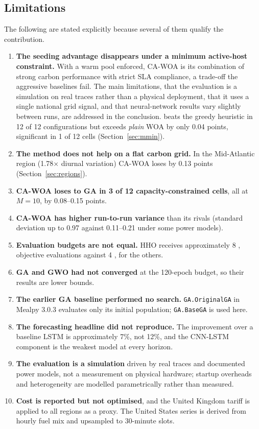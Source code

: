 \documentclass[12pt,a4paper]{article}
\providecommand{\DIFaddtex}[1]{{\protect\color{blue} \sf #1}} %
\providecommand{\DIFdeltex}[1]{{\protect\color{red} \scriptsize #1}} %
\providecommand{\DIFaddbegin}{} %
\providecommand{\DIFaddend}{} %
\providecommand{\DIFdelbegin}{} %
\providecommand{\DIFdelend}{} %
\providecommand{\DIFadd}[1]{\texorpdfstring{\DIFaddtex{#1}}{#1}} %
\providecommand{\DIFdel}[1]{\texorpdfstring{\DIFdeltex{#1}}{}} %
\providecommand{\DIFscaledelfig}{0.5}
\newlength{\DIFdelgraphicswidth} %
\newlength{\DIFdelgraphicsheight} %
\providecommand{\DIFaddincludegraphics}[2][]{{\color{blue}\fbox{\DIFOincludegraphics[#1]{#2}}}} %
\providecommand{\DIFdelincludegraphics}[2][]{%
\sbox{\DIFdelgraphicsbox}{\DIFOincludegraphics[#1]{#2}}%
\settoboxwidth{\DIFdelgraphicswidth}{\DIFdelgraphicsbox} %
\settoboxtotalheight{\DIFdelgraphicsheight}{\DIFdelgraphicsbox} %
\scalebox{\DIFscaledelfig}{%
\parbox[b]{\DIFdelgraphicswidth}{\usebox{\DIFdelgraphicsbox}\\[-\baselineskip] \rule{\DIFdelgraphicswidth}{0em}}\llap{\resizebox{\DIFdelgraphicswidth}{\DIFdelgraphicsheight}{%
\setlength{\unitlength}{\DIFdelgraphicswidth}%
\begin{picture}(1,1)%
\thicklines\linethickness{2pt} %
{\color[rgb]{1,0,0}\put(0,0){\framebox(1,1){}}}%
{\color[rgb]{1,0,0}\put(0,0){\line( 1,1){1}}}%
{\color[rgb]{1,0,0}\put(0,1){\line(1,-1){1}}}%
\end{picture}%
}\hspace*{3pt}}} %
} %
\DeclareRobustCommand{\DIFaddbegin}{\DIFOaddbegin \let\includegraphics\DIFaddincludegraphics} %
\DeclareRobustCommand{\DIFaddend}{\DIFOaddend \let\includegraphics\DIFOincludegraphics} %
\DeclareRobustCommand{\DIFdelbegin}{\DIFOdelbegin \let\includegraphics\DIFdelincludegraphics} %
\DeclareRobustCommand{\DIFdelend}{\DIFOaddend \let\includegraphics\DIFOincludegraphics} %
\begin{document}
\subsection{\DIFadd{Limitations}}\label{sec:limits}
\DIFadd{The following are stated explicitly because several of them qualify the contribution.
}\begin{enumerate}
\item \DIFadd{\textbf{The seeding advantage disappears under a minimum active-host constraint.} With a warm pool
enforced, }\DIFaddend CA-WOA \DIFdelbegin \DIFdel{is its combination of strong carbon
performance with strict SLA compliance, a trade-off the aggressive baselines fail.
The main limitations, that the evaluation is a simulation on real traces rather than a physical deployment, that it uses a
single
national grid signal, and that neural-network results vary slightly between runs, are addressed in the conclusion. }\DIFdelend \DIFaddbegin \DIFadd{beats the greedy heuristic in 12 of 12 configurations but exceeds \emph{plain} WOA by only
0.04 points, significant in 1 of 12 cells (Section~\ref{sec:mmin}).
}\item \DIFadd{\textbf{The method does not help on a flat carbon grid.} In the Mid-Atlantic region (1.78$\times$ diurnal
variation) CA-WOA loses by 0.13 points (Section~\ref{sec:regions}).
}\item \DIFadd{\textbf{CA-WOA loses to GA in 3 of 12 capacity-constrained cells}, all at $M=10$, by 0.08--0.15 points.
}\item \DIFadd{\textbf{CA-WOA has higher run-to-run variance} than its rivals (standard deviation up to 0.97 against
0.11--0.21 under some power models).
}\item \DIFadd{\textbf{Evaluation budgets are not equal.} HHO receives approximately 8}{\DIFadd{,}}\DIFadd{908 objective evaluations
against 4}{\DIFadd{,}}\DIFadd{840 for the others.
}\item \DIFadd{\textbf{GA and GWO had not converged} at the 120-epoch budget, so their results are lower bounds.
}\item \DIFadd{\textbf{The earlier GA baseline performed no search.} \texttt{GA.OriginalGA} in Mealpy 3.0.3 evaluates
only its initial population; \texttt{GA.BaseGA} is used here.
}\item \DIFadd{\textbf{The forecasting headline did not reproduce.} The improvement over a baseline LSTM is
approximately 7\%, not 12\%, and the CNN-LSTM component is the weakest model at every horizon.
}\item \DIFadd{\textbf{The evaluation is a simulation} driven by real traces and documented power models, not a
measurement on physical hardware; startup overheads and heterogeneity are modelled parametrically rather than
measured.
}\item \DIFadd{\textbf{Cost is reported but not optimised}, and the United Kingdom tariff is applied to all regions as
a proxy. The United States series is derived from hourly fuel mix and upsampled to 30-minute slots.
}\end{enumerate}
\DIFaddend 
\end{document}
